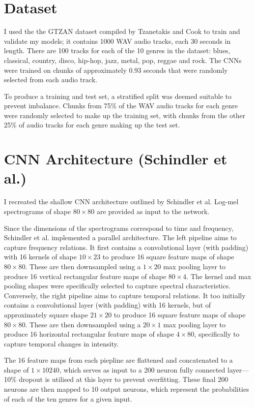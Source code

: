 \documentclass[conference]{IEEEtran}
\begin{document}
\section{Dataset}

I used the the GTZAN dataset compiled by Tzanetakis and Cook \cite{TzanetakisCook} to train and validate my models; it contains 1000 WAV audio tracks, each 30 seconds in length.
There are 100 tracks for each of the 10 genres in the dataset: blues, classical, country, disco, hip-hop, jazz, metal, pop, reggae and rock.
The CNNs were trained on chunks of approximately 0.93 seconds that were randomly selected from each audio track.

To produce a training and test set, a stratified split was deemed suitable to prevent imbalance.
Chunks from 75\% of the WAV audio tracks for each genre were randomly selected to make up the training set, with chunks from the other 25\% of audio tracks for each genre making up the test set.

\section{CNN Architecture (Schindler et al.)}

I recreated the shallow CNN architecture outlined by Schindler et al.
Log-mel spectrograms of shape $80\times80$ are provided as input to the network.

Since the dimensions of the spectrograms correspond to time and frequency, Schindler et al. implemented a parallel architecture.
The left pipeline aims to capture frequency relations.
It first contains a convolutional layer (with padding) with 16 kernels of shape $10\times23$ to produce 16 square feature maps of shape $80\times80$.
These are then downsampled using a $1\times20$ max pooling layer to produce 16 vertical rectangular feature maps of shape $80\times4$.
The kernel and max pooling shapes were specifically selected to capture spectral characteristics.
Conversely, the right pipeline aims to capture temporal relations.
It too initially contains a convolutional layer (with padding) with 16 kernels, but of approximately square shape $21\times20$ to produce 16 square feature maps of shape $80\times80$.
These are then downsampled using a $20\times1$ max pooling layer to produce 16 horizontal rectangular feature maps of shape $4\times80$, specifically to capture temporal changes in intensity.

The 16 feature maps from each piepline are flattened and concatenated to a shape of $1\times10240$, which serves as input to a 200 neuron fully connected layer---10\% dropout is utilised at this layer to prevent overfitting.
These final 200 neurons are then mapped to 10 output neurons, which represent the probabilities of each of the ten genres for a given input.
\end{document}
